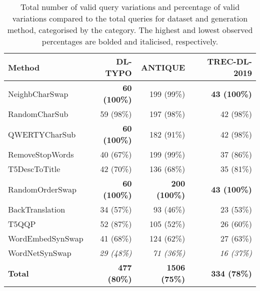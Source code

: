 \begin{table}[ht]
\centering
\caption{Total number of valid query variations and percentage of valid variations compared to the total queries for dataset and generation method, categorised by the category. The highest and lowest observed percentages are bolded and italicised, respectively.}
\label{tab:valid-vars}
\begin{tabularx}{\columnwidth}{X|r|r|r}
\textbf{Method}  & \textbf{DL-TYPO}    & \textbf{ANTIQUE}   & \textbf{TREC-DL-2019} \\ \hline
NeighbCharSwap   & \textbf{60 (100\%)}          & 199 (99\%)        & \textbf{43 (100\%)}            \\
RandomCharSub    & 59 (98\%)           & 197 (98\%)         & 42 (98\%)             \\
QWERTYCharSub    & \textbf{60 (100\%)}          & 182 (91\%)         & 42 (98\%)             \\ \hline
RemoveStopWords  & 40 (67\%)           & 199 (99\%)        & 37 (86\%)             \\
T5DescToTitle    & 42 (70\%)           & 136 (68\%)         & 35 (81\%)             \\ \hline
RandomOrderSwap  & \textbf{60 (100\%)}          & \textbf{200 (100\%)}        & \textbf{43 (100\%)}            \\ \hline
BackTranslation  & 34 (57\%)           & 93 (46\%)          & 23 (53\%)             \\
T5QQP            & 52 (87\%)           & 105 (52\%)         & 26 (60\%)             \\
WordEmbedSynSwap & 41 (68\%)           & 124 (62\%)         & 27 (63\%)             \\
WordNetSynSwap   & \textit{29 (48\%)}           & \textit{71 (36\%)}          & \textit{16 (37\%)}             \\ \hline
\textbf{Total}   & \textbf{477 (80\%)} & \textbf{1506 (75\%)} & \textbf{334 (78\%)}     \\ \hline
\end{tabularx}%
\end{table}
